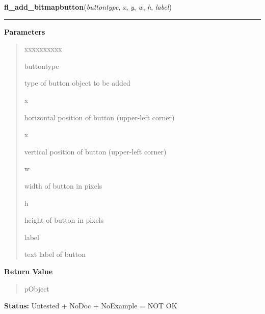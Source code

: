     \label{xformslib:library:fl_add_bitmapbutton}

    \vspace{0.5ex}

\hspace{.8\funcindent}\begin{boxedminipage}{\funcwidth}

    \raggedright \textbf{fl\_add\_bitmapbutton}(\textit{buttontype}, \textit{x}, \textit{y}, \textit{w}, \textit{h}, \textit{label})

    \vspace{-1.5ex}

    \rule{\textwidth}{0.5\fboxrule}
\setlength{\parskip}{2ex}
\setlength{\parskip}{1ex}
      \textbf{Parameters}
      \vspace{-1ex}

      \begin{quote}
        \begin{Ventry}{xxxxxxxxxx}

          \item[buttontype]

          type of button object to be added

          \item[x]

          horizontal position of button (upper-left corner)

          \item[x]

          vertical position of button (upper-left corner)

          \item[w]

          width of button in pixels

          \item[h]

          height of button in pixels

          \item[label]

          text label of button

        \end{Ventry}

      \end{quote}

      \textbf{Return Value}
    \vspace{-1ex}

      \begin{quote}
      pObject

      \end{quote}

\textbf{Status:} Untested + NoDoc + NoExample = NOT OK



    \end{boxedminipage}


